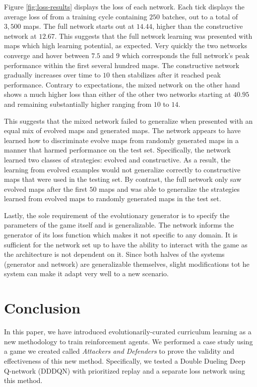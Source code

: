 \documentclass[letterpaper]{article} %
\begin{document}
Figure \ref{fig:loss-results} displays the loss of each network. Each tick displays the average loss of from a training cycle containing $250$ batches, out to a total of $3,500$ maps. The full network starts out at $14.44$, higher than the constructive network at $12.67$. This suggests that the full network learning was presented with maps which high learning potential, as expected. Very quickly the two networks converge and hover between $7.5$ and $9$ which corresponds the full network's peak performance within the first several hundred maps. The constructive network gradually increases over time to $10$ then stabilizes after it reached peak performance. Contrary to expectations, the mixed network on the other hand shows a much higher loss than either of the other two networks starting at $40.95$ and remaining substantially higher ranging from $10$ to $14$.

This suggests that the mixed network failed to generalize when presented with an equal mix of evolved maps and generated maps. The network appears to have learned how to discriminate evolve maps from randomly generated maps in a manner that harmed performance on the test set. Specifically, the network learned two classes of strategies: evolved and constructive. As a result, the learning from evolved examples would not generalize correctly to constructive maps that were used in the testing set. By contrast, the full network only saw evolved maps after the first $50$ maps and was able to generalize the strategies learned from evolved maps to randomly generated maps in the test set.

Lastly, the sole requirement of the evolutionary generator is to specify the parameters of the game itself and is generalizable. The network informs the generator of its loss function which makes it not specific to any domain. It is sufficient for the network set up to have the ability to interact with the game  as the architecture is not dependent on it. Since both halves of the systems (generator and network) are generalizable themselves, slight modifications tot he system can make it adapt very well to a new scenario.

\section{Conclusion}\label{sec:conclusion}
In this paper, we have introduced evolutionarily-curated curriculum learning as a new methodology to train reinforcement agents. We performed a case study using a game we created called \emph{Attackers and Defenders} to prove the validity and effectiveness of this new method. Specifically, we tested a Double Dueling Deep Q-network (DDDQN) with prioritized replay and a separate loss network using this method.
\end{document}
